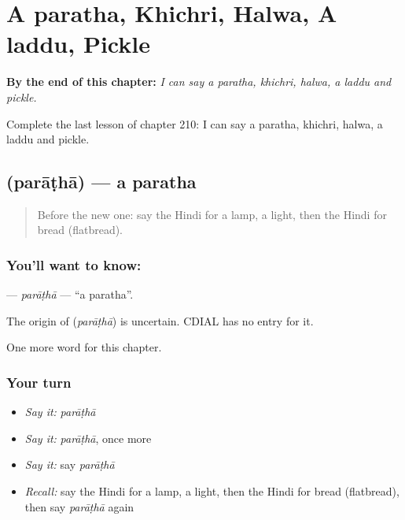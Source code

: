 
\chapter{A paratha, Khichri, Halwa, A laddu, Pickle}
\label{ch:hi-a-paratha-khichri-halwa-a-laddu-pickle}

\begin{chapteropening}
\textbf{By the end of this chapter:} \emph{I can say a paratha, khichri, halwa, a laddu and pickle.}

Complete the last lesson of chapter 210: I can say a paratha, khichri, halwa, a laddu and pickle.
\end{chapteropening}

\section[\texorpdfstring{\hi{पराठा} (parāṭhā)}{पराठा (parāṭhā)}]{ (parāṭhā) — a paratha}

\label{lesson:HI-C210-paratha}



\begin{quote}
Before the new one: say the Hindi for a lamp, a light, then the Hindi for bread (flatbread).
\end{quote}

\subsection*{You'll want to know: }
\textbf{} — \emph{parāṭhā} — \textquotedblleft{}a paratha\textquotedblright{}.

\begin{cousinweb}
The origin of \textbf{} (\emph{parāṭhā}) is uncertain. CDIAL has no entry for it.
\end{cousinweb}

\begin{grammarlens}[title={What you've built}]
One more word for this chapter.
\end{grammarlens}

\subsection*{Your turn}
\begin{itemize}
\raggedright
  \item \emph{Say it:} \emph{parāṭhā}
  \item \emph{Say it:} \emph{parāṭhā}, once more
  \item \emph{Say it:} say \emph{parāṭhā}
  \item \emph{Recall:} say the Hindi for a lamp, a light, then the Hindi for bread (flatbread), then say \emph{parāṭhā} again
\end{itemize}

